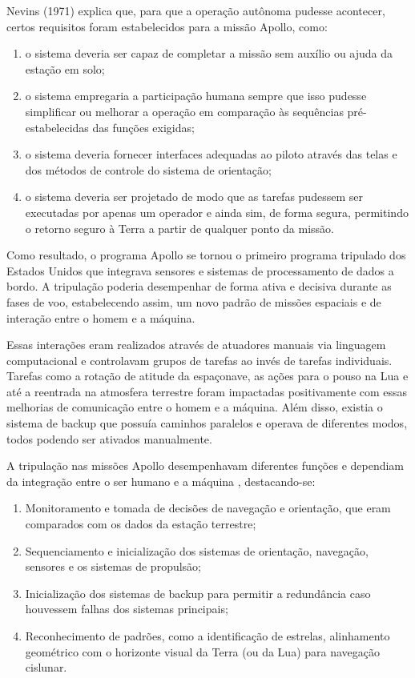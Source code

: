 Nevins (1971) explica que, para que a operação autônoma pudesse acontecer, certos requisitos foram estabelecidos para a missão Apollo, como:
\begin{enumerate}[label=(\roman*)]
    \item o sistema deveria ser capaz de completar a missão sem auxílio ou ajuda da estação em solo;
    \item o sistema empregaria a participação humana sempre que isso pudesse simplificar ou melhorar a operação em comparação às sequências pré-estabelecidas das funções exigidas;
    \item o sistema deveria fornecer interfaces adequadas ao piloto através das telas e dos métodos de controle do sistema de orientação;
    \item o sistema deveria ser projetado de modo que as tarefas pudessem ser executadas por apenas um operador e ainda sim, de forma segura, permitindo o retorno seguro à Terra a partir de qualquer ponto da missão.
\end{enumerate}

Como resultado, o programa Apollo se tornou o primeiro programa tripulado dos Estados Unidos que integrava sensores e sistemas de processamento de dados a bordo. A tripulação poderia desempenhar de forma ativa e decisiva durante as fases de voo, estabelecendo assim, um novo padrão de missões espaciais e de interação entre o homem e a máquina.

Essas interações eram realizados através de atuadores manuais via linguagem computacional e controlavam grupos de tarefas ao invés de tarefas individuais.
Tarefas como a rotação de atitude da espaçonave, as ações para o pouso na Lua e até a reentrada na atmosfera terrestre foram impactadas positivamente com essas melhorias de comunicação entre o homem e a máquina.
Além disso, existia o sistema de backup que possuía caminhos paralelos e operava de diferentes modos, todos podendo ser ativados manualmente.

A tripulação nas missões Apollo desempenhavam diferentes funções e dependiam da integração entre o ser humano e a máquina \cite{nevins1971}, destacando-se:
\begin{enumerate}[label=\roman*)]
    \item Monitoramento e tomada de decisões de navegação e orientação, que eram comparados com os dados da estação terrestre;
    \item Sequenciamento e inicialização dos sistemas de orientação, navegação, sensores e os sistemas de propulsão;
    \item Inicialização dos sistemas de backup para permitir a redundância caso houvessem falhas dos sistemas principais;
    \item Reconhecimento de padrões, como a identificação de estrelas, alinhamento geométrico com o horizonte visual da Terra (ou da Lua) para navegação cislunar.
\end{enumerate}

